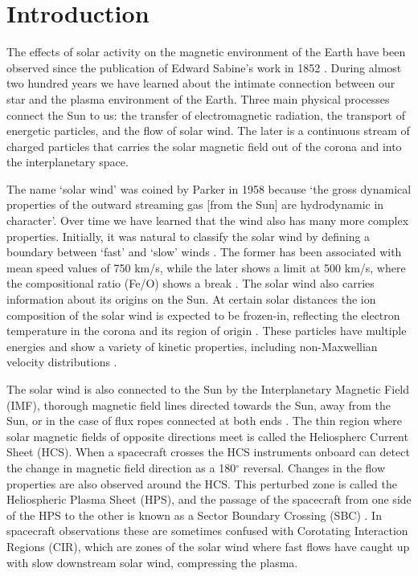 \documentclass[utf8]{frontiersSCNS} %
\begin{document}
\section{Introduction}
The effects of solar activity on the magnetic environment of the Earth have been observed since the publication of Edward Sabine's work in 1852 \citep{Sabine1852}. During almost two hundred years we have learned about the intimate connection between our star and the plasma environment of the Earth. Three main physical processes connect the Sun to us: the transfer of electromagnetic radiation, the transport of energetic particles, and the flow of solar wind. The later is a continuous stream of charged particles that carries the solar magnetic field out of the corona and into the interplanetary space.

The name `solar wind' was coined by Parker in 1958 because `the gross dynamical properties of the outward streaming gas [from the Sun] are hydrodynamic in character'\citep{Parker1958}. Over time we have learned that the wind also has many more complex properties. Initially, it was natural to classify the solar wind by defining a boundary between `fast' and `slow' winds \citep{Habbal1997}. The former has been associated with mean speed values of 750 km/s, while the later shows a limit at 500 km/s, where the compositional ratio (Fe/O) shows a break \citep{Feldman2005,Stakhiv2015}. The solar wind also carries information about its origins on the Sun. At certain solar distances the ion composition of the solar wind is expected to be frozen-in, reflecting the electron temperature in the corona and its region of origin \citep{Feldman2005,Zhao2009,Stakhiv2015}. These particles have multiple energies and show a variety of kinetic properties, including non-Maxwellian velocity distributions \citep{Pierrard2010,Matteini2012}.

The solar wind is also connected to the Sun by the Interplanetary Magnetic Field (IMF), thorough magnetic field lines directed towards the Sun, away from the Sun, or in the case of flux ropes connected at both ends \citep{Owens2016,Gosling2010}. The thin region where solar magnetic fields of opposite directions meet is called the Heliospherc Current Sheet (HCS). When a spacecraft crosses the HCS instruments onboard can detect the change in magnetic field direction as a 180$^\circ$ reversal. Changes in the flow properties are also observed around the HCS. This perturbed zone is called the Heliospheric Plasma Sheet (HPS), and the passage of the spacecraft from one side of the HPS to the other is known as a Sector Boundary Crossing (SBC) \citep{Winterhalter1994}. In spacecraft observations these are sometimes confused with Corotating Interaction Regions (CIR), which are zones of the solar wind where fast flows have caught up with slow downstream solar wind, compressing the plasma.
\end{document}
